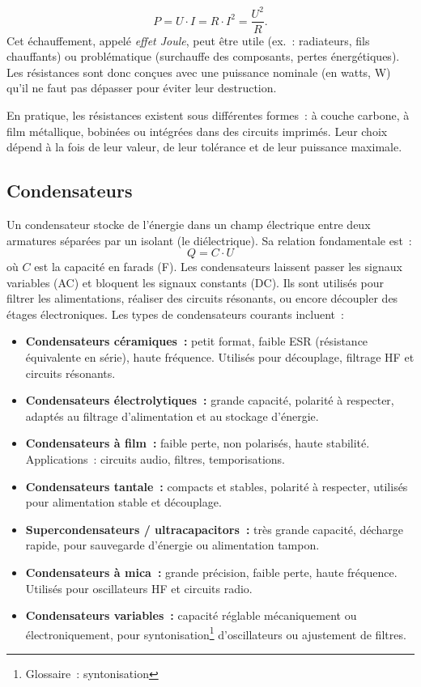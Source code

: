 \[
P = U \cdot I = R \cdot I^2 = \frac{U^2}{R}.
\]
Cet \'echauffement, appel\'e \emph{effet Joule}, peut \^etre utile (ex.~: radiateurs, fils chauffants) ou probl\'ematique (surchauffe des composants, pertes \'energ\'etiques). Les r\'esistances sont donc conçues avec une puissance nominale (en watts, \unit{\watt}) qu'il ne faut pas d\'epasser pour \'eviter leur destruction.\par
En pratique, les r\'esistances existent sous diff\'erentes formes~: à couche carbone, à film m\'etallique, bobin\'ees ou int\'egr\'ees dans des circuits imprim\'es. Leur choix d\'epend à la fois de leur valeur, de leur tol\'erance et de leur puissance maximale.

\subsection{Condensateurs} \label{subsec:capacitors}
Un condensateur stocke de l'\'energie dans un champ \'electrique entre deux armatures s\'epar\'ees par un isolant (le di\'electrique). Sa relation fondamentale est~:
\[
Q = C \cdot U
\]
où \(C\) est la capacit\'e en farads (\unit{\farad}).
Les condensateurs laissent passer les signaux variables (AC) et bloquent les signaux constants (DC). Ils sont utilis\'es pour filtrer les alimentations, r\'ealiser des circuits r\'esonants, ou encore d\'ecoupler des \'etages \'electroniques. Les types de condensateurs courants incluent~:
\begin{itemize}
  \item \textbf{Condensateurs c\'eramiques~:} petit format, faible ESR (r\'esistance \'equivalente en s\'erie), haute fr\'equence.
        Utilis\'es pour d\'ecouplage, filtrage HF et circuits r\'esonants.
  \item \textbf{Condensateurs \'electrolytiques~:} grande capacit\'e, polarit\'e à respecter,
        adapt\'es au filtrage d'alimentation et au stockage d'\'energie.
  \item \textbf{Condensateurs à film~:} faible perte, non polaris\'es, haute stabilit\'e.
        Applications~: circuits audio, filtres, temporisations.
  \item \textbf{Condensateurs tantale~:} compacts et stables, polarit\'e à respecter,
        utilis\'es pour alimentation stable et d\'ecouplage.
  \item \textbf{Supercondensateurs / ultracapacitors~:} tr\`es grande capacit\'e, d\'echarge rapide,
        pour sauvegarde d'\'energie ou alimentation tampon.
  \item \textbf{Condensateurs à mica~:} grande pr\'ecision, faible perte, haute fr\'equence.
        Utilis\'es pour oscillateurs HF et circuits radio.
  \item \textbf{Condensateurs variables~:} capacit\'e r\'eglable m\'ecaniquement ou \'electroniquement,
        pour syntonisation\footnote{Glossaire~: \gls{syntonisation}}  d'oscillateurs ou ajustement de filtres.
\end{itemize}

